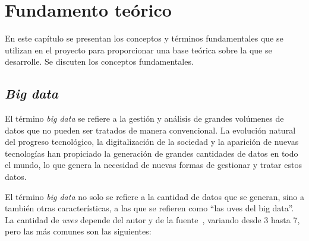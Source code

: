 \chapter{Fundamento teórico}\label{chap:teo}
En este capítulo se presentan los conceptos y términos fundamentales que se
utilizan en el proyecto para proporcionar una base teórica sobre la que se
desarrolle. Se discuten los conceptos fundamentales.


\section{\textit{Big data}}\label{sec:bigdata}
El término \textit{big data} se refiere a la gestión y análisis de grandes
volúmenes de datos que no pueden ser tratados de manera convencional. La
evolución natural del progreso tecnológico, la digitalización de la sociedad y
la aparición de nuevas tecnologías han propiciado la generación de grandes
cantidades de datos en todo el mundo, lo que genera la necesidad de nuevas
formas de gestionar y tratar estos datos.

El término \textit{big data} no solo se refiere a la cantidad de datos que se
generan, sino a también otras características, a las que se refieren como ``las
uves del big data''. La cantidad de \textit{uves} depende del autor y de la
fuente~\cite{ishwarappa2015vs,sagiroglu2013bigdata}, variando desde 3 hasta 7,
pero las más comunes son las siguientes:

